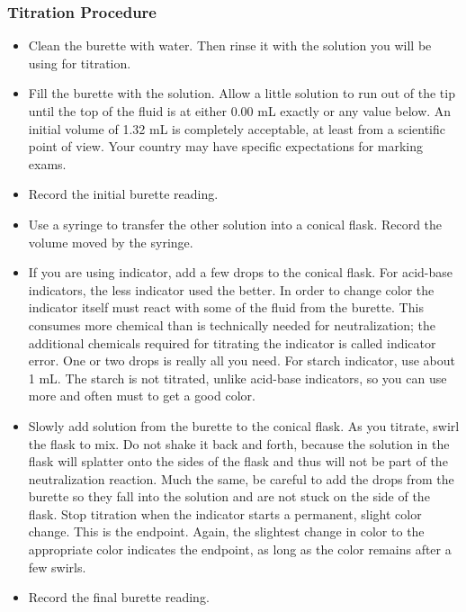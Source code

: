 \subsubsection{Titration Procedure}

\begin{itemize}

\item{Clean the burette with water. Then rinse it with the solution you will be using for titration.}

\item{Fill the burette with the solution. Allow a little solution to run out of the tip until the top of the fluid is at either 0.00 mL exactly or any value below. An initial volume of 1.32 mL is completely acceptable, at least from a scientific point of view. Your country may have specific expectations for marking exams.}

\item{Record the initial burette reading.}

\item{Use a syringe to transfer the other solution into a conical flask. Record the volume moved by the syringe.}

\item{If you are using indicator, add a few drops to the conical flask. For acid-base indicators, the less indicator used the better. In order to change color the indicator itself must react with some of the fluid from the burette. This consumes more chemical than is technically needed for neutralization; the additional chemicals required for titrating the indicator is called indicator error. One or two drops is really all you need. For starch indicator, use about 1 mL. The starch is not titrated, unlike acid-base indicators, so you can use more and often must to get a good color.}

\item{Slowly add solution from the burette to the conical flask. As you titrate, swirl the flask to mix. Do not shake it back and forth, because the solution in the flask will splatter onto the sides of the flask and thus will not be part of the neutralization reaction. Much the same, be careful to add the drops from the burette so they fall into the solution and are not stuck on the side of the flask. Stop titration when the indicator starts a permanent, slight color change. This is the endpoint. Again, the slightest change in color to the appropriate color indicates the endpoint, as long as the color remains after a few swirls.}

\item{Record the final burette reading.}

\end{itemize}

